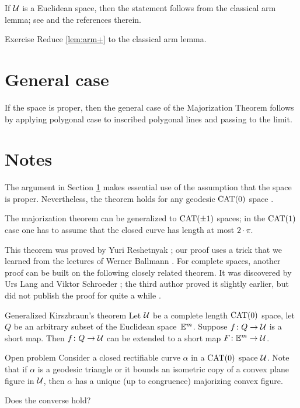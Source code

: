 If $\mathcal{U}$ is a Euclidean space, then the statement follows from the classical arm lemma;
see \cite{sabitov} and the references therein.

\begin{thm}{Exercise}\label{ex:arm-lemma}
Reduce \ref{lem:arm+} to the classical arm lemma.
\end{thm}

\section{General case}\label{seg:major-general}

If the space is proper, then the general case of the Majorization Theorem follows by applying polygonal case to inscribed polygonal lines and passing to the limit.

\section{Notes}

The argument in Section \ref{seg:major-general} makes essential use of the assumption that the space is proper.
Nevertheless, the theorem holds for any geodesic $\mathrm{CAT}(0)$ space \cite[9.56]{alexander-kapovitch-petrunin-2025}.

The majorization theorem can be generalized to $\mathrm{CAT}(\pm1)$ spaces;
in the $\mathrm{CAT}(1)$ case one has to assume that the closed curve has length at most $2\cdot\pi$.

This theorem was proved by Yuri Reshetnyak \cite{reshetnyak:major};
our proof uses a trick that we learned from the lectures of Werner Ballmann \cite{ballmann-1995}.
For complete spaces, another proof can be built  on the following closely related theorem.
It was discovered by Urs Lang and Viktor Schroeder \cite{lang-schroeder};
the third author proved it slightly earlier, but did not publish the proof for quite a while \cite{alexander-kapovitch-petrunin-2011,alexander-kapovitch-petrunin-2025}.


\begin{thm}{Generalized Kirszbraun's theorem}
\label{thm:kirsz+}
Let $\mathcal{U}$ be a complete length $\mathrm{CAT}(0)$ space, 
let $Q$ be an arbitrary subset of the Euclidean space~$\mathbb{E}^m$.
Suppose $f\colon Q\to\mathcal{U}$ is a short map.
Then $f\colon Q\to\mathcal{U}$ can be extended to a short map 
$F\colon\mathbb{E}^m\to \mathcal{U}$.
\end{thm}

\begin{thm}{Open problem}
Consider  a closed rectifiable curve $\alpha$ in a $\mathrm{CAT}(0)$ space $\mathcal{U}$.
Note that if $\alpha$ is a geodesic triangle or it bounds an isometric copy of a convex plane figure in $\mathcal{U}$, then $\alpha$ has a unique (up to congruence) majorizing convex figure.

Does the converse hold?
\end{thm}

